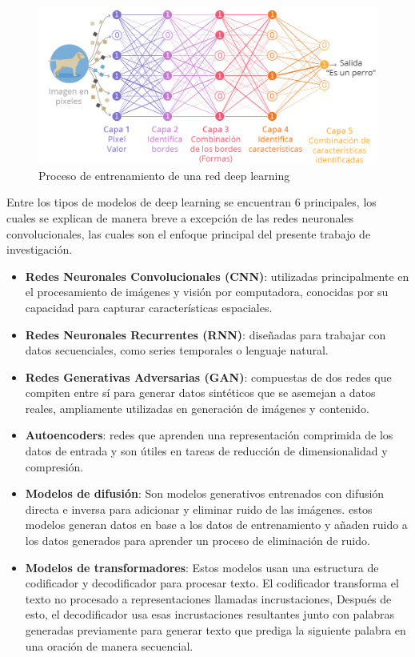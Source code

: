 \begin{figure}[ht!]
    \centering
    \includegraphics[width=\linewidth]{src/figures/deep_learning.png}
    \caption{Proceso de entrenamiento de una red deep learning \cite{deep_learning_img}}
    \label{fig:deep_learning_img}
\end{figure}

Entre los tipos de modelos de deep learning se encuentran 6 principales,
los cuales se explican de manera breve a excepción de las redes
neuronales convolucionales, las cuales son el enfoque principal del
presente trabajo de investigación.

\begin{itemize}
    \item \textbf{Redes Neuronales Convolucionales (CNN)}:
     utilizadas principalmente en el procesamiento de imágenes y 
     visión por computadora, conocidas por su capacidad para 
     capturar características espaciales.
    \item \textbf{Redes Neuronales Recurrentes (RNN)}: 
    diseñadas para trabajar con datos secuenciales, 
    como series temporales o lenguaje natural.
    \item \textbf{Redes Generativas Adversarias (GAN)}:
     compuestas de dos redes que compiten entre sí para generar datos
      sintéticos que se asemejan a datos reales, ampliamente utilizadas
       en generación de imágenes y contenido.
    \item \textbf{Autoencoders}: 
    redes que aprenden una representación comprimida de los datos
     de entrada y son útiles en tareas de reducción de dimensionalidad
      y compresión.
    \item \textbf{Modelos de difusión}: 
    Son modelos generativos entrenados con difusión directa e inversa
    para adicionar y eliminar ruido de las imágenes. estos modelos 
    generan datos en base a los datos de entrenamiento y añaden ruido 
    a los datos generados para aprender un proceso de eliminación de ruido.
    \item \textbf{Modelos de transformadores}: 
    Estos modelos usan una estructura de codificador y decodificador 
    para procesar texto. El codificador transforma el texto no procesado
    a representaciones llamadas incrustaciones, Después de esto,
    el decodificador usa esas incrustaciones resultantes 
    junto con palabras generadas previamente para generar texto que
    prediga la siguiente palabra en una oración de manera secuencial.
    \cite{ibm_deep_learning}
\end{itemize}

